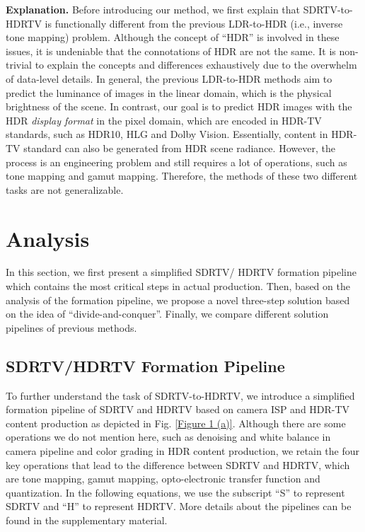 \documentclass[10pt,twocolumn,letterpaper]{article}
\begin{document}
\textbf{Explanation.}
Before introducing our method, we first explain that SDRTV-to-HDRTV is functionally different from the previous LDR-to-HDR (i.e., inverse tone mapping) problem. Although the concept of ``HDR'' is involved in these issues, it is undeniable that the connotations of HDR are not the same. It is non-trivial to explain the concepts and differences exhaustively due to the overwhelm of data-level details. In general, the previous LDR-to-HDR methods aim to predict the luminance of images in the linear domain, which is the physical brightness of the scene. In contrast, our goal is to predict HDR images with the HDR \emph{display format} in the pixel domain, which are encoded in HDR-TV standards, such as HDR10, HLG and Dolby Vision. Essentially, content in HDR-TV standard can also be generated from HDR scene radiance. However, the process is an engineering problem and still requires a lot of operations, such as tone mapping and gamut mapping. Therefore, the methods of these two different tasks are not generalizable.

\section{Analysis}
\label{Analysis}
In this section, we first present a simplified SDRTV/ HDRTV formation pipeline which contains the most critical steps in actual production. Then, based on the analysis of the formation pipeline, we propose a novel three-step solution based on the idea of ``divide-and-conquer''. Finally, we compare different solution pipelines of previous methods.

\subsection{SDRTV/HDRTV Formation Pipeline}
To further understand the task of SDRTV-to-HDRTV, we introduce a simplified formation pipeline of SDRTV and HDRTV based on camera ISP and HDR-TV content production \cite{bt2390} as depicted in Fig. \ref{Figure 1 (a)}. Although there are some operations we do not mention here, such as denoising and white balance in camera pipeline and color grading in HDR content production, we retain the four key operations that lead to the difference between SDRTV and HDRTV, which are tone mapping, gamut mapping, opto-electronic transfer function and quantization. In the following equations, we use the subscript ``S'' to represent SDRTV and ``H'' to represent HDRTV. More details about the pipelines can be found in the supplementary material.
\end{document}
